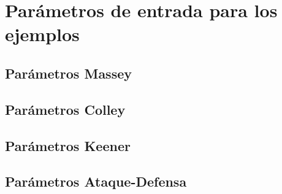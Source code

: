 \fbox{\parbox[b]{\linewidth}{
					
}}

\newpage

\section{Parámetros de entrada para los ejemplos}

\subsection*{Parámetros Massey}

\fbox{\parbox[b]{\linewidth}{
					
}}
	
\newpage	
	
\subsection*{Parámetros Colley}

\fbox{\parbox[b]{\linewidth}{
					
}}

\newpage

\subsection*{Parámetros Keener}

\fbox{\parbox[b]{\linewidth}{
					
}}

\newpage

\subsection*{Parámetros Ataque-Defensa}

\fbox{\parbox[b]{\linewidth}{
					
}}